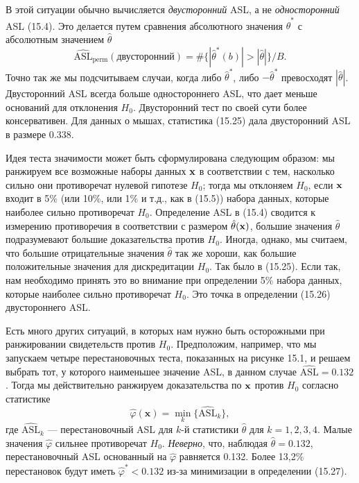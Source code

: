 В этой ситуации обычно вычисляется \textit{двусторонний} ASL, а не \textit{односторонний} ASL (15.4). Это делается путем сравнения абсолютного значения $\hat{\theta}^*$ с абсолютным значением $\hat{\theta}$
\begin{equation}
	\widehat{\text{ASL}}_{\text{perm}}(\text{двусторонний}) = \# \{ |\hat{\theta}^*(b)| > |\hat{\theta}| \}/B.
\end{equation}
Точно так же мы подсчитываем случаи, когда либо $\hat{\theta}^*$, либо $-\hat{\theta}^*$ превосходят $|\hat{\theta}|$. Двусторонний ASL всегда больше одностороннего ASL, что дает меньше оснований для отклонения $H_0$. Двусторонний тест по своей сути более консервативен. Для данных о мышах, статистика (15.25) дала двусторонний ASL в размере 0.338.

Идея теста значимости может быть сформулирована следующим образом: мы ранжируем все возможные наборы данных $\bf{x}$ в соответствии с тем, насколько сильно они противоречат нулевой гипотезе $H_0$; тогда мы отклоняем $H_0$, если $\bf{x}$ входит в 5\% (или 10\%, или 1\% и т.д., как в (15.5)) набора данных, которые наиболее сильно противоречат $H_0$. Определение ASL в (15.4) сводится к измерению противоречия в соответствии с размером $\hat{\theta}(\bf{x})$, большие значения $\hat{\theta}$ подразумевают большие доказательства против $H_0$. Иногда, однако, мы считаем, что большие отрицательные значения $\hat{\theta}$ так же хороши, как большие положительные значения для дискредитации $H_0$. Так было в (15.25). Если так, нам необходимо принять это во внимание при определении 5\% набора данных, которые наиболее сильно противоречат $H_0$. Это точка в определении (15.26) двустороннего ASL.

Есть много других ситуаций, в которых нам нужно быть осторожными при ранжировании свидетельств против $H_0$. Предположим, например, что мы запускаем четыре перестановочных теста, показанных на рисунке 15.1, и решаем выбрать тот, у которого наименьшее значение ASL, в данном случае $\widehat{\text{ASL}} = 0.132$. Тогда мы действительно ранжируем доказательства по $\bf{x}$ против $H_0$ согласно статистике
\begin{equation}
	\hat{\varphi}(\textbf{x}) = \min_k \{ \widehat{\text{ASL}}_k \},
\end{equation}
где $\widehat{\text{ASL}}_k$ --- перестановочный ASL для $k$-й статистики $\hat{\theta}$ для $k = 1, 2, 3, 4$. Малые значения $\hat{\varphi}$ сильнее противоречат $H_0$. \textit{Неверно}, что, наблюдая $\hat{\theta} = 0.132$, перестановочный ASL основанный на $\hat{\varphi}$ равняется 0.132. Более 13,2\% перестановок будут иметь $\hat{\varphi}^* < 0.132$ из-за минимизации в определении (15.27).

